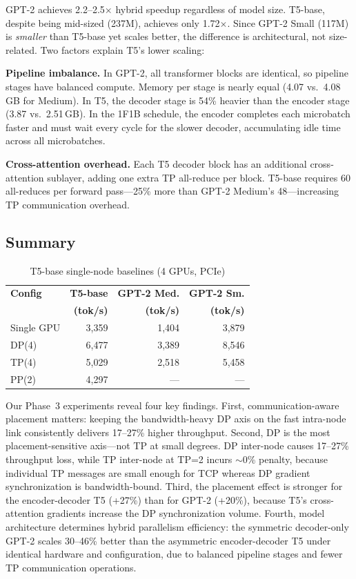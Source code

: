 \documentclass[conference]{IEEEtran}
\begin{document}
GPT-2 achieves 2.2--2.5$\times$ hybrid speedup regardless of model size. T5-base, despite being mid-sized (237M), achieves only 1.72$\times$. Since GPT-2 Small (117M) is \textit{smaller} than T5-base yet scales better, the difference is architectural, not size-related. Two factors explain T5's lower scaling:

\textbf{Pipeline imbalance.} In GPT-2, all transformer blocks are identical, so pipeline stages have balanced compute. Memory per stage is nearly equal (4.07 vs.\ 4.08\,GB for Medium). In T5, the decoder stage is 54\% heavier than the encoder stage (3.87 vs.\ 2.51\,GB). In the 1F1B schedule, the encoder completes each microbatch faster and must wait every cycle for the slower decoder, accumulating idle time across all microbatches.

\textbf{Cross-attention overhead.} Each T5 decoder block has an additional cross-attention sublayer, adding one extra TP all-reduce per block. T5-base requires 60 all-reduces per forward pass---25\% more than GPT-2 Medium's 48---increasing TP communication overhead.

\subsection{Summary}

\begin{table}[h]
\centering
\caption{T5-base single-node baselines (4 GPUs, PCIe)}
\label{tab:t5baselines}
\small
\begin{tabular}{lrrr}
\toprule
\textbf{Config} & \textbf{T5-base} & \textbf{GPT-2 Med.} & \textbf{GPT-2 Sm.} \\
 & \textbf{(tok/s)} & \textbf{(tok/s)} & \textbf{(tok/s)} \\
\midrule
Single GPU & 3,359 & 1,404 & 3,879 \\
DP(4) & 6,477 & 3,389 & 8,546 \\
TP(4) & 5,029 & 2,518 & 5,458 \\
PP(2) & 4,297 & --- & --- \\
\bottomrule
\end{tabular}
\end{table}

Our Phase~3 experiments reveal four key findings. First, communication-aware placement matters: keeping the bandwidth-heavy DP axis on the fast intra-node link consistently delivers 17--27\% higher throughput. Second, DP is the most placement-sensitive axis---not TP at small degrees. DP inter-node causes 17--27\% throughput loss, while TP inter-node at TP=2 incurs $\sim$0\% penalty, because individual TP messages are small enough for TCP whereas DP gradient synchronization is bandwidth-bound. Third, the placement effect is stronger for the encoder-decoder T5 (+27\%) than for GPT-2 (+20\%), because T5's cross-attention gradients increase the DP synchronization volume. Fourth, model architecture determines hybrid parallelism efficiency: the symmetric decoder-only GPT-2 scales 30--46\% better than the asymmetric encoder-decoder T5 under identical hardware and configuration, due to balanced pipeline stages and fewer TP communication operations.
\end{document}
